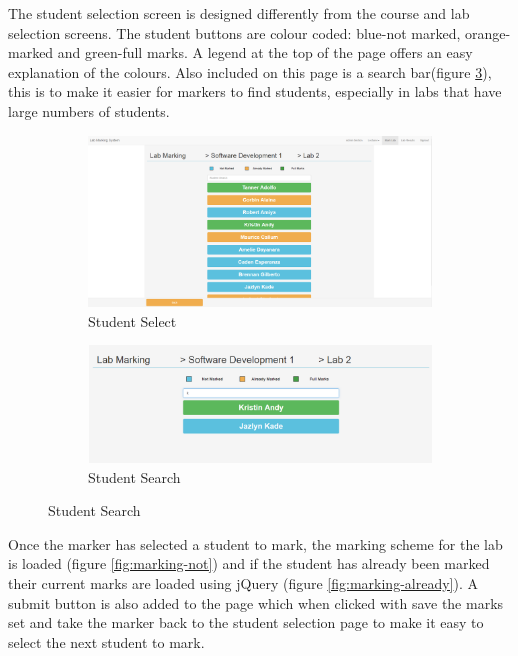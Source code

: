 \documentclass[11pt]{report}
\begin{document}
\noindent The student selection screen is designed differently from the course and lab selection screens. The student buttons are colour coded: blue-not marked, orange-marked and green-full marks. A legend at the top of the page offers an easy explanation of the colours. Also included on this page is a search bar(figure \ref{fig:marking-search}), this is to make it easier for markers to find students, especially in labs that have large numbers of students.

\begin{figure}[H]
\caption{Selecting Student Page}
\centering
\begin{subfigure}[c]{0.45\textwidth}
    \includegraphics[width=1\textwidth]{images/implementation/marking-3-page.png}
    \caption{Student Select}
    \label{fig:marking-student}
\end{subfigure}
\hfill
\begin{subfigure}[c]{0.45\textwidth}
    \includegraphics[width=1\textwidth]{images/implementation/marking-4-page.png}
    \caption{Student Search}
    \label{fig:marking-search}
\end{subfigure}

\end{figure}

\noindent Once the marker has selected a student to mark, the marking scheme for the lab is loaded (figure \ref{fig:marking-not}) and if the student has already been marked their current marks are loaded using jQuery (figure \ref{fig:marking-already}). A submit button is also added to the page which when clicked with save the marks set and take the marker back to the student selection page to make it easy to select the next student to mark.
\end{document}

